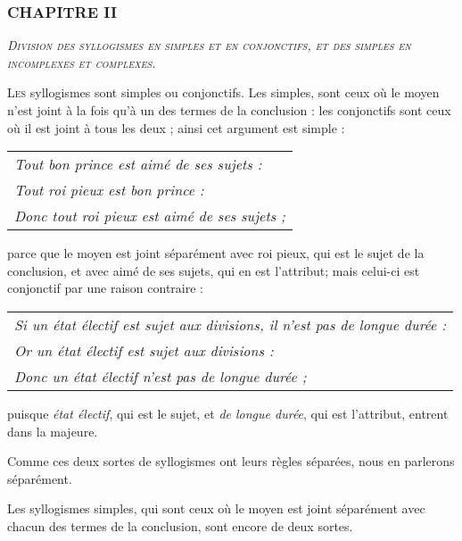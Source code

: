 \subsubsection{\centering \Large CHAPITRE II}
\begin{center}\emph{\large\scshape Division des syllogismes en simples et en conjonctifs, et des simples en incomplexes et complexes.}\end{center}


	\lettrine{L}{es} syllogismes sont simples ou conjonctifs. Les simples, sont ceux où le moyen n'est joint à la fois qu'à un des termes de la conclusion : les conjonctifs sont ceux où il est joint à tous les deux ; ainsi cet argument est simple :

\begin{center}
	\begin{tabular}{l}
		\emph{Tout bon prince est aimé de ses sujets :} \\
		\emph{Tout roi pieux est bon prince :} \\
		\emph{Donc tout roi pieux est aimé de ses sujets ;} \\
	\end{tabular}
\end{center}

parce que le moyen est joint séparément avec roi pieux, qui est le sujet de la conclusion, et avec aimé de ses sujets, qui en est l'attribut; mais celui-ci est conjonctif par une raison contraire :

	\begin{tabularx}{\textwidth}{X}
		\emph{Si un état électif est sujet aux divisions, il n'est pas de longue durée :} \\
		\emph{Or un état électif est sujet aux divisions :} \\
		\emph{Donc un état électif n'est pas de longue durée ;} \\
	\end{tabularx}

puisque \emph{état électif}, qui est le sujet, et \emph{de longue durée}, qui est l'attribut, entrent dans la majeure.

Comme ces deux sortes de syllogismes ont leurs règles séparées, nous en parlerons séparément.

Les syllogismes simples, qui sont ceux où le moyen est joint séparément avec chacun des termes de la conclusion, sont encore de deux sortes.

